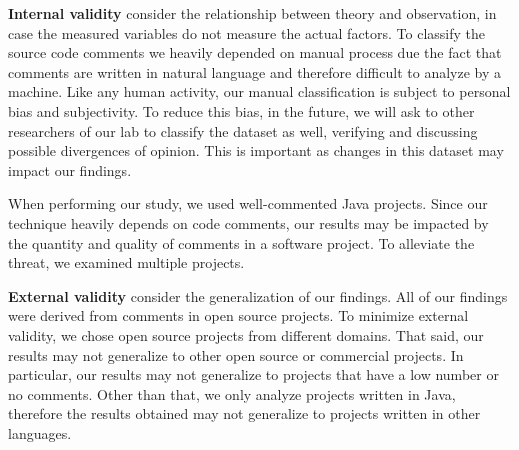 \noindent\textbf{Internal validity} consider the relationship between theory and observation, in case the measured variables do not measure the actual factors. To classify the source code comments we heavily depended on manual process due the fact that comments are written in natural language and therefore difficult to analyze by a machine. Like any human activity, our manual classification is subject to personal bias and subjectivity. To reduce this bias, in the future, we will ask to other researchers of our lab to classify the dataset as well, verifying and discussing possible divergences of opinion. This is important as changes in this dataset may impact our findings. 

When performing our study, we used well-commented Java projects. Since our technique heavily depends on code comments, our results may be impacted by the quantity and quality of comments in a software project. To alleviate the threat, we examined multiple projects.

\noindent \textbf{External validity} consider the generalization of our findings. All of our findings were derived from comments in open source projects. To minimize external validity, we chose open source projects from different domains. That said, our results may not generalize to other open source or commercial projects. In particular, our results may not generalize to projects that have a low number or no comments. Other than that, we only analyze projects written in Java, therefore the results obtained may not generalize to projects written in other languages.